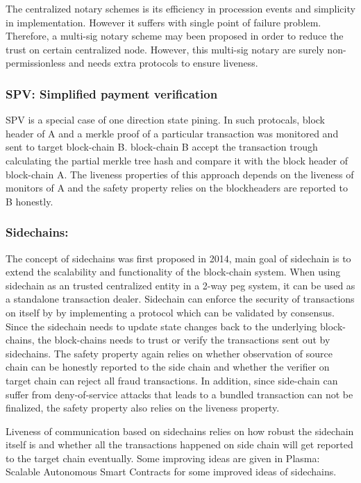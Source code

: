 \documentclass[pageno]{jpaper}
\begin{document}
The centralized notary schemes is its efficiency in procession events and simplicity in implementation. However it suffers with single point of failure problem. Therefore, a multi-sig notary scheme may been proposed in order to reduce the trust on certain centralized node. However, this multi-sig notary are surely non-permissionless and needs extra protocols to ensure liveness.
\\
\subsubsection{SPV: Simplified payment verification}

    SPV is a special case of one direction state pining. In such protocals, block header of A and a merkle proof of a particular transaction was monitored and sent to target block-chain B. block-chain B accept the transaction trough calculating the partial merkle tree hash and compare it with the block header of block-chain A. The liveness properties of this approach depends on the liveness of monitors of A and the safety property relies on the blockheaders are reported to B honestly. 
\\
\subsubsection{Sidechains:}

    The concept of sidechains was first proposed in 2014, main goal of sidechain is to extend the scalability and functionality of the block-chain system. When using sidechain as an trusted centralized entity in a 2-way peg system, it can be used as a standalone transaction dealer. 
    Sidechain can enforce the security of transactions on itself by by implementing a protocol which can be validated by consensus. Since the sidechain needs to update state changes back to the underlying block-chains, the block-chains needs to trust or verify the transactions sent out by sidechains. The safety property again relies on whether observation of source chain can be honestly reported to the side chain and whether the verifier on target chain can reject all fraud transactions. In addition, since side-chain can suffer from deny-of-service attacks that leads to a bundled transaction can not be finalized, the safety property also relies on the liveness property.

    Liveness of communication based on sidechains relies on how robust the sidechain itself is and whether all the transactions happened on side chain will get reported to the target chain eventually. Some improving ideas are given in Plasma: Scalable Autonomous Smart Contracts for some improved ideas of sidechains.
\\
\end{document}
